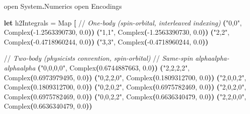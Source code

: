 \documentclass[
  11pt,
  oneside]{book}
\newenvironment{Shaded}{\begin{snugshade}}{\end{snugshade}}
\newcommand{\CommentTok}[1]{\textcolor[rgb]{0.56,0.35,0.01}{\textit{#1}}}
\newcommand{\FloatTok}[1]{\textcolor[rgb]{0.00,0.00,0.81}{#1}}
\newcommand{\KeywordTok}[1]{\textcolor[rgb]{0.13,0.29,0.53}{\textbf{#1}}}
\newcommand{\NormalTok}[1]{#1}
\newcommand{\OperatorTok}[1]{\textcolor[rgb]{0.81,0.36,0.00}{\textbf{#1}}}
\newcommand{\OtherTok}[1]{\textcolor[rgb]{0.56,0.35,0.01}{#1}}
\newcommand{\StringTok}[1]{\textcolor[rgb]{0.31,0.60,0.02}{#1}}
\begin{document}
\begin{Shaded}
\begin{Highlighting}[]
\OtherTok{open}\NormalTok{ System}\KeywordTok{.}\NormalTok{Numerics}
\OtherTok{open}\NormalTok{ Encodings}

\KeywordTok{let}\NormalTok{ h2Integrals = Map }\OperatorTok{[}
\NormalTok{    //}\CommentTok{ One{-}body (spin{-}orbital, interleaved indexing)}
    \OperatorTok{(}\StringTok{"0,0"}\NormalTok{, Complex}\OperatorTok{(}\FloatTok{{-}1.2563390730}\NormalTok{, }\FloatTok{0.0}\OperatorTok{))}
    \OperatorTok{(}\StringTok{"1,1"}\NormalTok{, Complex}\OperatorTok{(}\FloatTok{{-}1.2563390730}\NormalTok{, }\FloatTok{0.0}\OperatorTok{))}
    \OperatorTok{(}\StringTok{"2,2"}\NormalTok{, Complex}\OperatorTok{(}\FloatTok{{-}0.4718960244}\NormalTok{, }\FloatTok{0.0}\OperatorTok{))}
    \OperatorTok{(}\StringTok{"3,3"}\NormalTok{, Complex}\OperatorTok{(}\FloatTok{{-}0.4718960244}\NormalTok{, }\FloatTok{0.0}\OperatorTok{))}

\NormalTok{    //}\CommentTok{ Two{-}body (physicist\textquotesingle{}s convention, spin{-}orbital)}
\NormalTok{    //}\CommentTok{ Same{-}spin alphaalpha{-}alphaalpha}
    \OperatorTok{(}\StringTok{"0,0,0,0"}\NormalTok{, Complex}\OperatorTok{(}\FloatTok{0.6744887663}\NormalTok{, }\FloatTok{0.0}\OperatorTok{))}
    \OperatorTok{(}\StringTok{"2,2,2,2"}\NormalTok{, Complex}\OperatorTok{(}\FloatTok{0.6973979495}\NormalTok{, }\FloatTok{0.0}\OperatorTok{))}
    \OperatorTok{(}\StringTok{"0,2,2,0"}\NormalTok{, Complex}\OperatorTok{(}\FloatTok{0.1809312700}\NormalTok{, }\FloatTok{0.0}\OperatorTok{))}
    \OperatorTok{(}\StringTok{"2,0,0,2"}\NormalTok{, Complex}\OperatorTok{(}\FloatTok{0.1809312700}\NormalTok{, }\FloatTok{0.0}\OperatorTok{))}
    \OperatorTok{(}\StringTok{"0,2,0,2"}\NormalTok{, Complex}\OperatorTok{(}\FloatTok{0.6975782469}\NormalTok{, }\FloatTok{0.0}\OperatorTok{))}
    \OperatorTok{(}\StringTok{"2,0,2,0"}\NormalTok{, Complex}\OperatorTok{(}\FloatTok{0.6975782469}\NormalTok{, }\FloatTok{0.0}\OperatorTok{))}
    \OperatorTok{(}\StringTok{"0,0,2,2"}\NormalTok{, Complex}\OperatorTok{(}\FloatTok{0.6636340479}\NormalTok{, }\FloatTok{0.0}\OperatorTok{))}
    \OperatorTok{(}\StringTok{"2,2,0,0"}\NormalTok{, Complex}\OperatorTok{(}\FloatTok{0.6636340479}\NormalTok{, }\FloatTok{0.0}\OperatorTok{))}


\end{Highlighting}
\end{Shaded}
\end{document}
